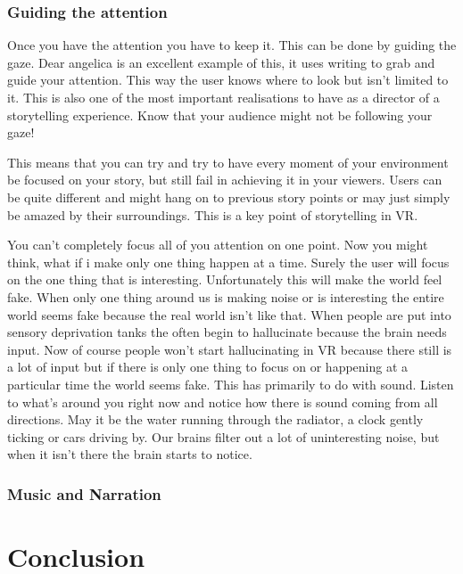 \documentclass{report}
\begin{document}
				\subsection{Guiding the attention} 
				
				Once you have the attention you have to keep it. This can be done by guiding the gaze. Dear angelica is an excellent example of this, it uses writing to grab and guide your attention. This way the user knows where to look but isn't limited to it. This is also one of the most important realisations to have as a director of a storytelling experience. Know that your audience might not be following your gaze!
				
				This means that you can try and try to have every moment of your environment be focused on your story, but still fail in achieving it in your viewers. Users can be quite different and might hang on to previous story points or may just simply be amazed by their surroundings. This is a key point of storytelling in VR.
				
				You can't completely focus all of you attention on one point. Now you might think, what if i make only one thing happen at a time. Surely the user will focus on the one thing that is interesting. Unfortunately this will make the world feel fake. When only one thing around us is making noise or is interesting the entire world seems fake because the real world isn't like that. When people are put into sensory deprivation tanks the often begin to hallucinate because the brain needs input. Now of course people won't start hallucinating in VR because there still is a lot of input but if there is only one thing to focus on or happening at a particular time the world seems fake. 
				This has primarily to do with sound. Listen to what's around you right now and notice how there is sound coming from all directions. May it be the water running through the radiator, a clock gently ticking or cars driving by. Our brains filter out a lot of uninteresting noise, but when it isn't there the brain starts to notice.
				
				\subsection{Music and Narration}
								
				\chapter{Conclusion}
\end{document}
